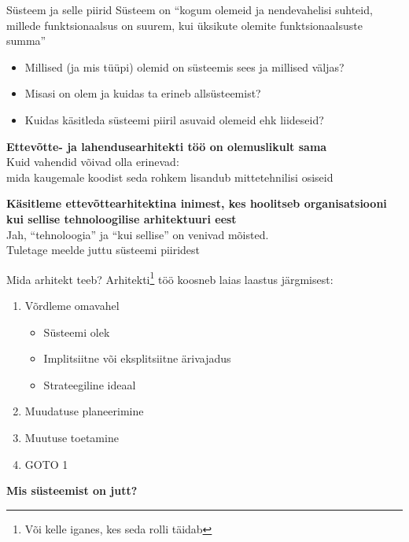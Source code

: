 \documentclass{beamer}
\begin{document}
\begin{frame}{Süsteem ja selle piirid}
Süsteem on \enquote{kogum olemeid ja nendevahelisi suhteid, millede funktsionaalsus on suurem, kui üksikute olemite funktsionaalsuste summa}
	\begin{itemize}
		\item Millised (ja mis tüüpi) olemid on süsteemis sees ja millised väljas?
		\item Misasi on olem ja kuidas ta erineb allsüsteemist? 
		\item Kuidas käsitleda süsteemi piiril asuvaid olemeid ehk liideseid?
	\end{itemize}
\end{frame}

\begin{frame}[fragile]
	\begin{center}
		\LARGE{\textbf{Ettevõtte- ja lahendusearhitekti töö on olemuslikult sama}}
		\\[4cm]
		\small{Kuid vahendid võivad olla erinevad: \\mida kaugemale koodist seda rohkem lisandub mittetehnilisi osiseid}
	\end{center}
\end{frame}

\begin{frame}[fragile]
	\begin{center}
		\LARGE{\textbf{Käsitleme ettevõttearhitektina inimest, kes hoolitseb organisatsiooni kui sellise tehnoloogilise arhitektuuri eest}}
		\\[4cm]
		\small{Jah, \enquote{tehnoloogia} ja \enquote{kui sellise} on venivad mõisted. \\Tuletage meelde juttu süsteemi piiridest}
	\end{center}
\end{frame}

\begin{frame}{Mida arhitekt teeb?}
	Arhitekti\footnote{Või kelle iganes, kes seda rolli täidab} töö koosneb laias laastus järgmisest:
	\begin{enumerate}
		\item Võrdleme omavahel
		\begin{itemize}
			\item Süsteemi olek
			\item Implitsiitne või eksplitsiitne ärivajadus
			\item Strateegiline ideaal
		\end{itemize}
		\item Muudatuse planeerimine
		\item Muutuse toetamine
		\item GOTO 1
	\end{enumerate}
	\begin{center}
			\textbf{Mis süsteemist on jutt?}
	\end{center}
\end{frame}
\end{document}
